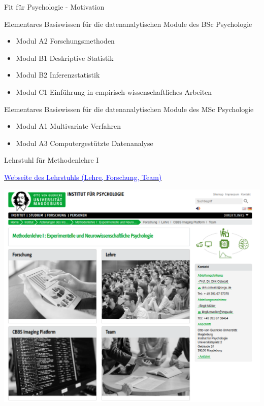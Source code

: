 \documentclass[
  8pt,
  ignorenonframetext,
  t]{beamer}
\providecommand{\tightlist}{%
  \setlength{\itemsep}{0pt}\setlength{\parskip}{0pt}}
\begin{document}
\begin{frame}{Fit für Psychologie - Motivation}
\protect\hypertarget{fit-fuxfcr-psychologie---motivation}{}

Elementares Basiswissen für die datenanalytischen Module des BSc
Psychologie

\small

\begin{itemize}
\tightlist
\item
  Modul A2 Forschungsmethoden
\item
  Modul B1 Deskriptive Statistik
\item
  Modul B2 Inferenzstatistik
\item
  Modul C1 Einführung in empirisch-wissenschaftliches Arbeiten
\end{itemize}

\normalsize

Elementares Basiswissen für die datenanalytischen Module des MSc
Psychologie

\small

\begin{itemize}
\tightlist
\item
  Modul A1 Multivariate Verfahren
\item
  Modul A3 Computergestützte Datenanalyse
\end{itemize}
\end{frame}

\begin{frame}{Lehrstuhl für Methodenlehre I}
\protect\hypertarget{lehrstuhl-fuxfcr-methodenlehre-i}{}

\href{https://www.ipsy.ovgu.de/methodenlehre_I-path-980,1404.html}{\textcolor{blue}{Webseite des Lehrstuhls (Lehre, Forschung, Team)}}

\vspace{3mm}

\begin{center}\includegraphics[width=0.7\linewidth]{../Abbildungen/Lehrstuhlseite} \end{center}
\end{frame}
\end{document}
